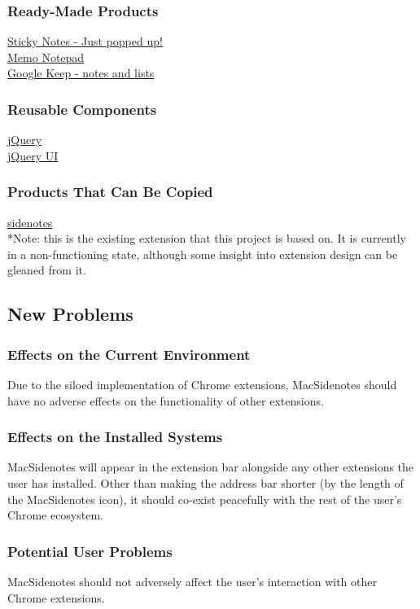 \documentclass[12pt, titlepage]{article}
\begin{document}
\subsubsection{Ready-Made Products}
	\href{https://chrome.google.com/webstore/detail/sticky-notes-just-popped/plpdjbappofmfbgdmhoaabefbobddchk}
	{Sticky Notes - Just popped up!}\\
	\href{https://chrome.google.com/webstore/detail/memo-notepad/nmoihkoninaoanjobiiknmgenhpaecec}
	{Memo Notepad}\\
	\href{https://chrome.google.com/webstore/detail/google-keep-notes-and-lis/hmjkmjkepdijhoojdojkdfohbdgmmhki?hl=en}
	{Google Keep - notes and lists}
	
\subsubsection{Reusable Components}
	\href{https://jquery.com}
	{jQuery}\\
	\href{http://jqueryui.com/}
	{jQuery UI}
	
\subsubsection{Products That Can Be Copied}
	\href{https://github.com/sidenotes/sidenotes}
	{sidenotes}\\
	*Note: this is the existing extension that this project is based on. It is currently in a non-functioning state, although some insight into extension design can be gleaned from it.
\subsection{New Problems}
\subsubsection{Effects on the Current Environment}
	Due to the siloed implementation of Chrome extensions, MacSidenotes should have no adverse effects on the functionality of other extensions.
\subsubsection{Effects on the Installed Systems}
	MacSidenotes will appear in the extension bar alongside any other extensions the user has installed. Other than making the address bar shorter (by the length of the MacSidenotes icon), it should co-exist peacefully with the rest of the user's Chrome ecosystem.
\subsubsection{Potential User Problems}
	MacSidenotes should not adversely affect the user's interaction with other Chrome extensions.
\end{document}
